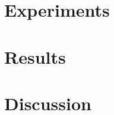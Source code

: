 \label{chap:results}

\section{Experiments}      
\section{Results}      
\section{Discussion}      


